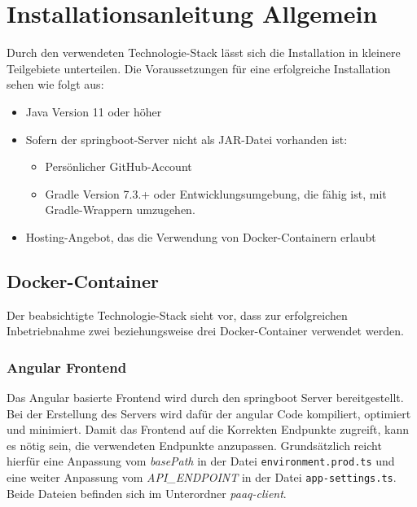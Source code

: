 \documentclass[../main.tex]{subfiles}
\begin{document}
	\section{Installationsanleitung Allgemein}
	Durch den verwendeten Technologie-Stack lässt sich die Installation in kleinere Teilgebiete unterteilen. Die Voraussetzungen für eine erfolgreiche Installation sehen wie folgt aus:
	\begin{itemize}
		\item Java Version 11 oder höher
		\item Sofern der \gls{springboot}-Server nicht als JAR-Datei vorhanden ist:
		\begin{itemize}
			\item Persönlicher GitHub-Account
			\item Gradle Version 7.3.+ oder Entwicklungsumgebung, die fähig ist, mit Gradle-Wrappern umzugehen.
		\end{itemize}
		\item Hosting-Angebot, das die Verwendung von Docker-Containern erlaubt
	\end{itemize}
	
	\subsection{Docker-Container}
	Der beabsichtigte Technologie-Stack sieht vor, dass zur erfolgreichen Inbetriebnahme zwei beziehungsweise drei Docker-Container verwendet werden.
	
	\subsubsection{Angular Frontend}
	\par \noindent Das Angular basierte Frontend wird durch den \gls{springboot} Server bereitgestellt. Bei der Erstellung des Servers wird dafür der \gls{angular} Code kompiliert, optimiert und minimiert. Damit das Frontend auf die Korrekten Endpunkte zugreift, kann es nötig sein, die verwendeten Endpunkte anzupassen. Grundsätzlich reicht hierfür eine Anpassung vom \textit{basePath} in der Datei \texttt{environment.prod.ts} und eine weiter Anpassung vom \textit{API\_ENDPOINT} in der Datei \texttt{app-settings.ts}. Beide Dateien befinden sich im Unterordner \textit{paaq-client}.
	
\end{document}
